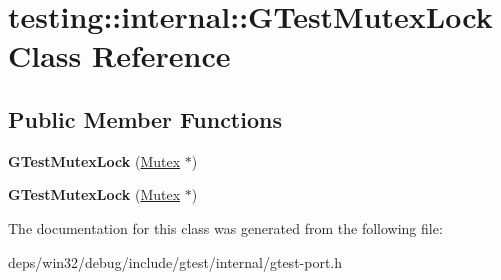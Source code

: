 \hypertarget{classtesting_1_1internal_1_1_g_test_mutex_lock}{}\section{testing\+:\+:internal\+:\+:G\+Test\+Mutex\+Lock Class Reference}
\label{classtesting_1_1internal_1_1_g_test_mutex_lock}
\subsection*{Public Member Functions}
\begin{DoxyCompactItemize}
\item 
\hypertarget{classtesting_1_1internal_1_1_g_test_mutex_lock_a77e3cba326d5356b4a1dea3790559c26}{}{\bfseries G\+Test\+Mutex\+Lock} (\hyperlink{classtesting_1_1internal_1_1_mutex}{Mutex} $\ast$)\label{classtesting_1_1internal_1_1_g_test_mutex_lock_a77e3cba326d5356b4a1dea3790559c26}

\item 
\hypertarget{classtesting_1_1internal_1_1_g_test_mutex_lock_a77e3cba326d5356b4a1dea3790559c26}{}{\bfseries G\+Test\+Mutex\+Lock} (\hyperlink{classtesting_1_1internal_1_1_mutex}{Mutex} $\ast$)\label{classtesting_1_1internal_1_1_g_test_mutex_lock_a77e3cba326d5356b4a1dea3790559c26}

\end{DoxyCompactItemize}


The documentation for this class was generated from the following file\+:\begin{DoxyCompactItemize}
\item 
deps/win32/debug/include/gtest/internal/gtest-\/port.\+h\end{DoxyCompactItemize}

